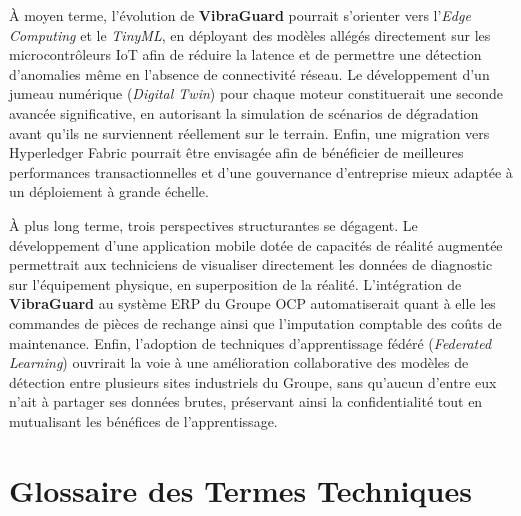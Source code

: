 \documentclass[12pt, a4paper, oneside]{report}
\newif\ifinappendixpart
\newcommand{\projectname}{\textbf{VibraGuard}}
\begin{document}
À moyen terme, l'évolution de \projectname{} pourrait s'orienter vers l'\textit{Edge Computing}
et le \textit{TinyML}, en déployant des modèles allégés directement sur les microcontrôleurs IoT
afin de réduire la latence et de permettre une détection d'anomalies même en l'absence de
connectivité réseau. Le développement d'un jumeau numérique (\textit{Digital Twin}) pour chaque
moteur constituerait une seconde avancée significative, en autorisant la simulation de scénarios
de dégradation avant qu'ils ne surviennent réellement sur le terrain. Enfin, une migration vers
Hyperledger Fabric pourrait être envisagée afin de bénéficier de meilleures performances
transactionnelles et d'une gouvernance d'entreprise mieux adaptée à un déploiement à grande échelle.

À plus long terme, trois perspectives structurantes se dégagent. Le développement d'une
application mobile dotée de capacités de réalité augmentée permettrait aux techniciens de
visualiser directement les données de diagnostic sur l'équipement physique, en superposition de
la réalité. L'intégration de \projectname{} au système ERP du Groupe OCP automatiserait quant à
elle les commandes de pièces de rechange ainsi que l'imputation comptable des coûts de
maintenance. Enfin, l'adoption de techniques d'apprentissage fédéré (\textit{Federated Learning})
ouvrirait la voie à une amélioration collaborative des modèles de détection entre plusieurs
sites industriels du Groupe, sans qu'aucun d'entre eux n'ait à partager ses données brutes,
préservant ainsi la confidentialité tout en mutualisant les bénéfices de l'apprentissage.

\appendix
\inappendixparttrue

\chapter{Glossaire des Termes Techniques}
\end{document}
